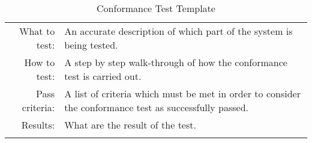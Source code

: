 \begin{table}[H]
  \begin{tabular}{r | p{8cm}}
    \noalign{\smallskip}\hline\noalign{\smallskip}
    
    What to test:  & An accurate description of which part of the system is being
    tested. \\

    \noalign{\smallskip}\hline\noalign{\smallskip}

    How to test:   & A step by step walk-through of how the conformance test is
    carried out. \\

    \noalign{\smallskip}\hline\noalign{\smallskip}

    Pass criteria: & A list of criteria which must be met in order to consider
    the conformance test as successfully passed. \\

    \noalign{\smallskip}\hline\noalign{\smallskip}
    
    Results: &  What are the result of the test. \\
   \noalign{\smallskip}\hline\noalign{\smallskip}
  
  
  
  \end{tabular}
  \caption{Conformance Test Template}
  \label{testing:fitness:pipeline_test}
\end{table}

